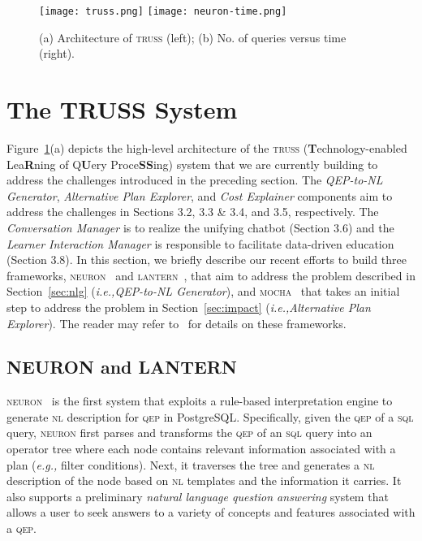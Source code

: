 \documentclass[11pt]{article}
\newcommand{\ie}{\emph{i.e.,}\xspace}
\newcommand{\eg}{\emph{e.g.,}\xspace}
\begin{document}
\begin{figure}[t]
\centering
\texttt{[image: truss.png]}
\texttt{[image: neuron-time.png]}
\vspace{0ex}\caption{(a) Architecture of \textsc{truss} (left); (b) No. of queries versus time (right).}
\label{fig:neuron}
\vspace{0ex}\end{figure}


\section{The TRUSS System}  
\label{sec:truss}
 Figure~\ref{fig:neuron}(a) depicts the high-level architecture of the \textsc{truss} (\textbf{T}echnology-enabled Lea\textbf{R}ning of Q\textbf{U}ery Proce\textbf{SS}ing) system that we are currently building to address the challenges introduced in the preceding section.  The \textit{QEP-to-NL Generator}, \textit{Alternative Plan Explorer}, and \textit{Cost Explainer} components aim to address the challenges in Sections 3.2, 3.3 \& 3.4, and 3.5, respectively. The \textit{Conversation Manager} is to realize the unifying chatbot (Section 3.6) and the \textit{Learner Interaction Manager} is responsible to facilitate data-driven education (Section 3.8). In this section, we briefly describe our recent efforts to build three frameworks, \textsc{neuron}~\cite{neuron} and \textsc{lantern}~\cite{lantern-demo}, that aim to address the problem described in Section~\ref{sec:nlg} (\ie \textit{QEP-to-NL Generator}), and \textsc{mocha}~\cite{mocha} that takes an initial step to address the problem in Section~\ref{sec:impact} (\ie  \textit{Alternative Plan Explorer}).  The reader may refer to~\cite{neuron,lantern,lantern-demo,mocha} for details on these frameworks.
\subsection{NEURON and LANTERN} %
\textsc{neuron}~\cite{neuron,neuron-soft} is the first system that exploits a rule-based interpretation engine to generate \textsc{nl} description for \textsc{qep} in PostgreSQL.  Specifically, given the \textsc{qep} of a \textsc{sql} query, \textsc{neuron} first parses and transforms the \textsc{qep} of an \textsc{sql} query into an operator tree where each node contains relevant information associated with a plan (\eg filter conditions). Next, it traverses the tree and generates a \textsc{nl} description of the node based on \textsc{nl} templates and the information it carries.  It also supports a preliminary \textit{natural language question answering}  system that allows a user to seek answers to a variety of concepts and features associated with a \textsc{qep}. 
\end{document}
